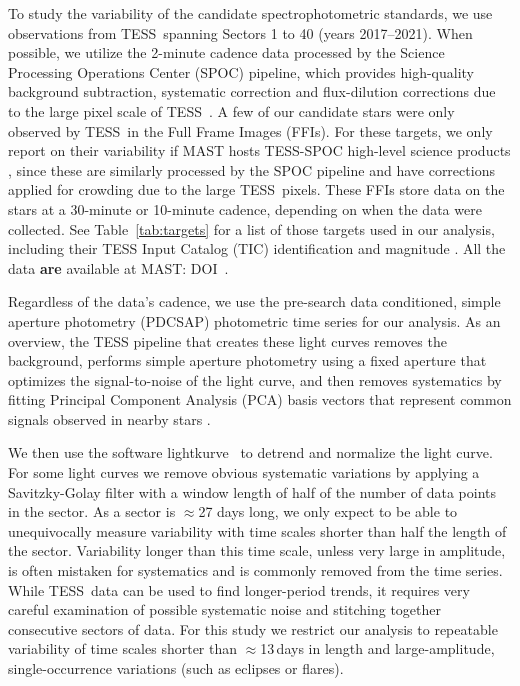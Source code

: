 \documentclass[twocolumn, linenumbers]{aastex631}
\newcommand{\tess}{TESS}
\newcommand{\lightkurve}{{{\fontfamily{lmtt}\selectfont lightkurve}}}
\begin{document}
To study the variability of the candidate spectrophotometric standards, we use observations from \tess\ spanning Sectors 1 to 40 (years 2017--2021). When possible, we utilize the 2-minute cadence data processed by the Science Processing Operations Center (SPOC) pipeline, which provides high-quality background subtraction, systematic correction and flux-dilution corrections due to the large pixel scale of \tess\ \citep{kdph2020ksciApertures,kdph2020ksciCal,kdph2020ksciPA,kdph2020PDC}. A few of our candidate stars were only observed by \tess\ in the Full Frame Images (FFIs). For these targets, we only report on their variability if MAST hosts \tess-SPOC high-level science products \citep{Caldwell2020spoc}, since these are similarly processed by the SPOC pipeline and have corrections applied for crowding due to the large \tess\ pixels. These FFIs store data on the stars at a 30-minute or 10-minute cadence, depending on when the data were collected. See Table~\ref{tab:targets} for a list of those targets used in our analysis, including their TESS Input Catalog (TIC) identification and magnitude \citep{Stassun2018TIC}. All the data \textbf{are} available at MAST: DOI\, .

Regardless of the data's cadence, we use the pre-search data conditioned, simple aperture photometry (PDCSAP) photometric time series \citep{kdph2020PDC} for our analysis. As an overview, the TESS pipeline that creates these light curves removes the background, performs simple aperture photometry using a fixed aperture that optimizes the signal-to-noise of the light curve, and then removes systematics by fitting Principal Component Analysis (PCA) basis vectors that represent common signals observed in nearby stars \citep{Smith2012,Stumpe2012PASP}. 

We then use the software \lightkurve\ \citep{lightkurve} to detrend and normalize the light curve. For some light curves we remove obvious systematic variations by applying a Savitzky-Golay filter \citep{savgol1964AnaCh..36.1627S} with a window length of half of the number of data points in the sector. As a sector is $\approx$27 days long, we only expect to be able to unequivocally measure variability with time scales shorter than half the length of the sector.  Variability longer than this time scale, unless very large in amplitude, is often mistaken for systematics and is commonly removed from the time series. While \tess\ data can be used to find longer-period trends, it requires very careful examination of possible systematic noise and stitching together consecutive sectors of data. For this study we restrict our analysis to repeatable variability of time scales shorter than $\approx$13\,days in length and large-amplitude, single-occurrence variations (such as eclipses or flares).
\end{document}
